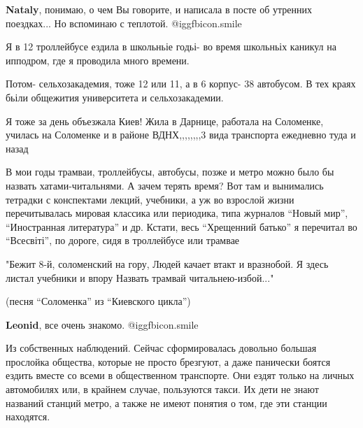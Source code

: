\begin{itemize}
\begin{itemize} %
\textbf{Nataly}, понимаю, о чем Вы говорите, и написала в посте об утренних поездках... Но вспоминаю с теплотой. @igg{fbicon.smile} 
\end{itemize} %


Я в 12 троллейбусе ездила в школьньіе годьі- во время школьньіх каникул на
ипподром, где я проводила много времени.

Потом- сельхозакадемия, тоже 12 или 11, а в 6 корпус- 38 автобусом. В тех краях
бьіли общежития университета и сельхозакадемии.


Я тоже за день объезжала Киев! Жила в Дарнице, работала на Соломенке, училась
на Соломенке и в районе ВДНХ,,,,,,,,3 вида транспорта ежедневно туда и назад


В мои годы трамваи, троллейбусы, автобусы, позже и метро можно было бы назвать
хатами-читальнями. А зачем терять время? Вот там и вынимались тетрадки с
конспектами лекций, учебники, а уж во взрослой жизни перечитывалась мировая
классика или периодика, типа журналов \enquote{Новый мир}, \enquote{Иностранная литература} и
др. Кстати, весь \enquote{Хрещенний батько} я перечитал во \enquote{Всесвіті}, по дороге, сидя
в троллейбусе или трамвае

{\em\color{blue}
\begin{displayquote}
\obeycr
"Бежит 8-й, соломенский на гору,
Людей качает втакт и вразнобой.
Я здесь листал учебники и впору
Назвать трамвай читальнею-избой..."
\restorecr
\end{displayquote}
}

(песня \enquote{Соломенка} из \enquote{Киевского цикла})

\begin{itemize} %
\textbf{Leonid}, все очень знакомо. @igg{fbicon.smile} 
\end{itemize} %


Из собственных наблюдений. Сейчас сформировалась довольно большая прослойка
общества, которые не просто брезгуют, а даже панически боятся ездить вместе со
всеми в общественном транспорте. Они ездят только на личных автомобилях или, в
крайнем случае, пользуются такси. Их дети не знают названий станций метро, а
также не имеют понятия о том, где эти станции находятся.


\end{itemize}
